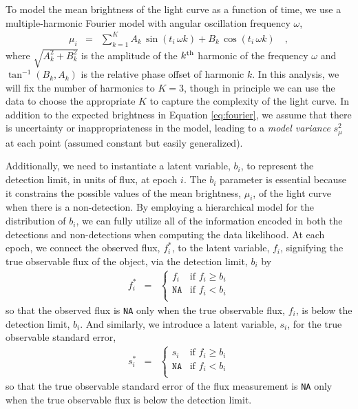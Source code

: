 \documentclass[12pt,preprint]{aastex}
\newcommand{\fobs}{f_i^*}
\newcommand{\sobs}{s_i^*}
\begin{document}
To model the mean brightness of the light curve as a function of time, we use a multiple-harmonic Fourier model with angular oscillation frequency $\omega$,
\begin{eqnarray}\displaystyle
\mu_i &=& \sum_{k=1}^K A_k\, \sin (t_i \, \omega  k) + B_k\, \cos (t_i \, \omega  k)
\quad ,\label{eq:fourier}
\end{eqnarray}
where $\sqrt{A_k^2 + B_k^2}$ is the amplitude of the $k^{\rm th}$ harmonic of the frequency $\omega$ and $\tan^{-1}(B_k,A_k)$ is the relative phase offset of harmonic $k$.  In this analysis, we will fix the number of harmonics to $K=3$, though in principle we can use the data to choose the appropriate $K$ to capture the complexity of the light curve.  In addition to the expected brightness in Equation \ref{eq:fourier}, we assume that there is uncertainty or inappropriateness in the model, leading to a \emph{model variance} $s_\mu^2$ at each point (assumed constant but easily generalized).


Additionally, we need to instantiate a latent variable, $b_i$, to represent the detection limit, in units of flux, at epoch $i$.  The $b_i$ parameter is essential because it constrains the possible values of the mean brightness, $\mu_i$, of the light curve when there is a non-detection.  By employing a hierarchical model for the distribution of $b_i$, we can fully utilize all of the information encoded in both the detections and non-detections when computing the data likelihood.   At each epoch, we connect the observed flux, $\fobs$, to the latent variable, $f_i$, signifying the true observable flux of the object, via the detection limit, $b_i$ by
\begin{eqnarray}\displaystyle
\fobs &=& \left\{\begin{array}{ll}
  f_i & \mbox{if $f_i \ge b_i$} \\
  \texttt{NA} & \mbox{if $f_i < b_i$} \\
\end{array} \right.
\end{eqnarray}
so that the observed flux is \texttt{NA} only when the true observable flux, $f_i$, is below the detection limit, $b_i$.  And similarly, we introduce a latent variable, $s_i$, for the true observable standard error,
\begin{eqnarray}\displaystyle
\sobs &=& \left\{\begin{array}{ll}
  s_i & \mbox{if $f_i \ge b_i$} \\
  \texttt{NA} & \mbox{if $f_i < b_i$} \\
\end{array} \right.
\end{eqnarray}
so that the true observable standard error of the flux measurement is \texttt{NA} only when the true observable flux is below the detection limit.
\end{document}
